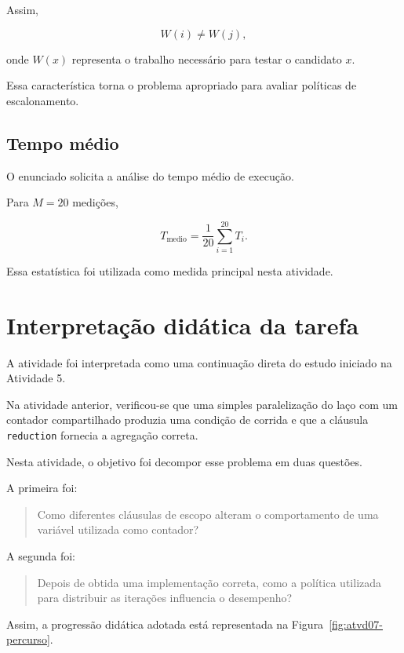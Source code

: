 Assim,

\[
W(i)\neq W(j),
\]

onde \(W(x)\) representa o trabalho necessário para testar o candidato
\(x\).

Essa característica torna o problema apropriado para avaliar políticas de
escalonamento.


\subsection{Tempo médio}

O enunciado solicita a análise do tempo médio de execução.

Para \(M=20\) medições,

\[
T_{\mathrm{medio}}
=
\frac{1}{20}
\sum_{i=1}^{20}T_i.
\]

Essa estatística foi utilizada como medida principal nesta atividade.


\section{Interpretação didática da tarefa}
\label{sec:atvd07-interpretacao}

A atividade foi interpretada como uma continuação direta do estudo iniciado
na Atividade 5.

Na atividade anterior, verificou-se que uma simples paralelização do laço
com um contador compartilhado produzia uma condição de corrida e que a
cláusula \texttt{reduction} fornecia a agregação correta.

Nesta atividade, o objetivo foi decompor esse problema em duas questões.

A primeira foi:

\begin{quote}
Como diferentes cláusulas de escopo alteram o comportamento de uma variável
utilizada como contador?
\end{quote}

A segunda foi:

\begin{quote}
Depois de obtida uma implementação correta, como a política utilizada para
distribuir as iterações influencia o desempenho?
\end{quote}

Assim, a progressão didática adotada está representada na
Figura~\ref{fig:atvd07-percurso}.

